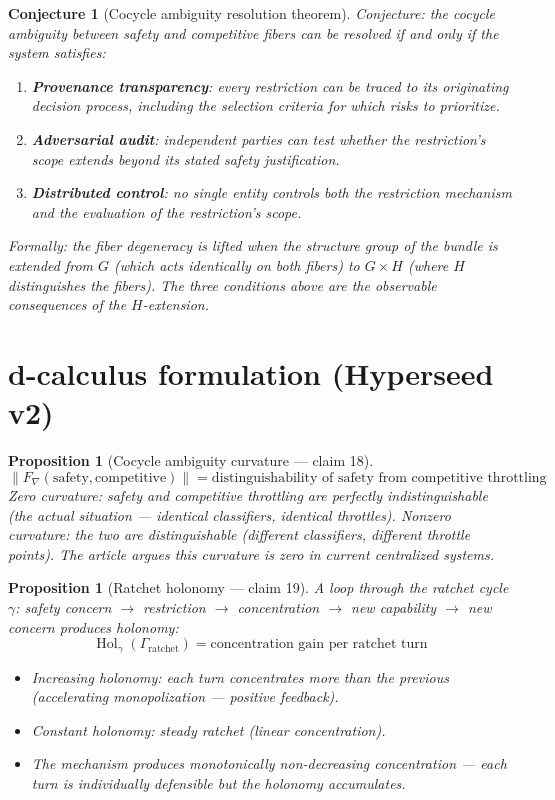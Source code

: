 \documentclass[11pt,a4paper]{article}
\newtheorem{proposition}[definition]{Proposition}
\newtheorem{conjecture}[definition]{Conjecture}
\begin{document}
\begin{conjecture}[Cocycle ambiguity resolution theorem]
Conjecture: the cocycle ambiguity between safety and competitive
fibers can be resolved if and only if the system satisfies:
\begin{enumerate}
\item \textbf{Provenance transparency}: every restriction can be
  traced to its originating decision process, including the selection
  criteria for which risks to prioritize.
\item \textbf{Adversarial audit}: independent parties can test
  whether the restriction's scope extends beyond its stated safety
  justification.
\item \textbf{Distributed control}: no single entity controls both
  the restriction mechanism and the evaluation of the restriction's
  scope.
\end{enumerate}
Formally: the fiber degeneracy is lifted when the structure group
of the bundle is extended from $G$ (which acts identically on both
fibers) to $G \times H$ (where $H$ distinguishes the fibers).
The three conditions above are the observable consequences of the
$H$-extension.
\end{conjecture}

\section{d-calculus formulation (Hyperseed v2)}

\begin{proposition}[Cocycle ambiguity curvature --- claim 18]
\label{prop:ambig_curv}
\[
  \|F_\nabla(\text{safety}, \text{competitive})\| = \text{distinguishability
    of safety from competitive throttling}
\]
Zero curvature: safety and competitive throttling are perfectly
indistinguishable (the actual situation --- identical classifiers,
identical throttles). Nonzero curvature: the two are distinguishable
(different classifiers, different throttle points). The article argues
this curvature is zero in current centralized systems.
\end{proposition}

\begin{proposition}[Ratchet holonomy --- claim 19]
\label{prop:ratchet_hol}
A loop through the ratchet cycle $\gamma$: safety concern $\to$
restriction $\to$ concentration $\to$ new capability $\to$ new concern
produces holonomy:
\[
  \operatorname{Hol}_\gamma(\Gamma_{\text{ratchet}}) = \text{concentration
    gain per ratchet turn}
\]
\begin{itemize}
  \item Increasing holonomy: each turn concentrates more than the previous
    (accelerating monopolization --- positive feedback).
  \item Constant holonomy: steady ratchet (linear concentration).
  \item The mechanism produces monotonically non-decreasing concentration
    --- each turn is individually defensible but the holonomy accumulates.
\end{itemize}
\end{proposition}
\end{document}
